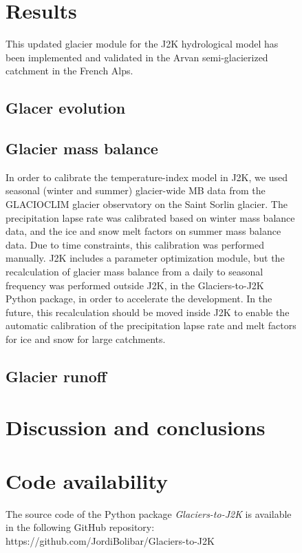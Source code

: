 \begin{figure}[h]
\section{Results}

This updated glacier module for the J2K hydrological model has been implemented and validated in the Arvan semi-glacierized catchment in the French Alps.

\subsection{Glacer evolution}

\subsection{Glacier mass balance}

In order to calibrate the temperature-index model in J2K, we used seasonal (winter and summer) glacier-wide MB data from the GLACIOCLIM glacier observatory on the Saint Sorlin glacier. The precipitation lapse rate was calibrated based on winter mass balance data, and the ice and snow melt factors on summer mass balance data. Due to time constraints, this calibration was performed manually. J2K includes a parameter optimization module, but the recalculation of glacier mass balance from a daily to seasonal frequency was performed outside J2K, in the Glaciers-to-J2K Python package, in order to accelerate the development. In the future, this recalculation should be moved inside J2K to enable the automatic calibration of the precipitation lapse rate and melt factors for ice and snow for large catchments. 

\subsection{Glacier runoff}

\section{Discussion and conclusions}

\section{Code availability}

The source code of the Python package \textit{Glaciers-to-J2K} is available in the following GitHub repository: https://github.com/JordiBolibar/Glaciers-to-J2K


\end{figure}
